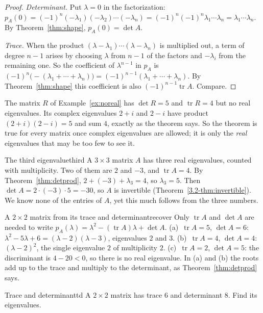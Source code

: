 \documentclass[11pt]{article}
\begin{document}
\begin{proof}
\emph{Determinant.} Put $\lambda=0$ in the factorization: $p_A(0)=(-1)^n(-\lambda_1)(-\lambda_2)\cdots(-\lambda_n)=(-1)^n(-1)^n\lambda_1\cdots\lambda_n=\lambda_1\cdots\lambda_n$. By Theorem~\ref{thm:shape}, $p_A(0)=\det A$.

\emph{Trace.} When the product $(\lambda-\lambda_1)\cdots(\lambda-\lambda_n)$ is multiplied out, a term of degree $n-1$ arises by choosing $\lambda$ from $n-1$ of the factors and $-\lambda_i$ from the remaining one. So the coefficient of $\lambda^{n-1}$ in $p_A$ is $(-1)^n\bigl(-(\lambda_1+\cdots+\lambda_n)\bigr)=(-1)^{n-1}(\lambda_1+\cdots+\lambda_n)$. By Theorem~\ref{thm:shape} this coefficient is also $(-1)^{n-1}\operatorname{tr}A$. Compare.
\end{proof}

The matrix $R$ of Example~\ref{ex:noreal} has $\det R=5$ and $\operatorname{tr}R=4$ but no real eigenvalues. Its complex eigenvalues $2+i$ and $2-i$ have product $(2+i)(2-i)=5$ and sum $4$, exactly as the theorem says. So the theorem is true for every matrix once complex eigenvalues are allowed; it is only the \emph{real} eigenvalues that may be too few to see it.

\begin{exmp}{The third eigenvalue}{third}
A $3\times3$ matrix $A$ has three real eigenvalues, counted with multiplicity. Two of them are $2$ and $-3$, and $\operatorname{tr}A=4$. By Theorem~\ref{thm:detprod}, $2+(-3)+\lambda_3=4$, so $\lambda_3=5$. Then $\det A=2\cdot(-3)\cdot5=-30$, so $A$ is invertible (Theorem~\ref{3.2-thm:invertible}). We know none of the entries of $A$, yet this much follows from the three numbers.
\end{exmp}

\begin{exmp}{A $2\times2$ matrix from its trace and determinant}{recover}
Only $\operatorname{tr}A$ and $\det A$ are needed to write $p_A(\lambda)=\lambda^2-(\operatorname{tr}A)\lambda+\det A$. (a)~$\operatorname{tr}A=5$, $\det A=6$: $\lambda^2-5\lambda+6=(\lambda-2)(\lambda-3)$, eigenvalues $2$ and $3$. (b)~$\operatorname{tr}A=4$, $\det A=4$: $(\lambda-2)^2$, the single eigenvalue $2$ of multiplicity $2$. (c)~$\operatorname{tr}A=2$, $\det A=5$: the discriminant is $4-20<0$, so there is no real eigenvalue. In (a) and (b) the roots add up to the trace and multiply to the determinant, as Theorem~\ref{thm:detprod} says.
\end{exmp}

\begin{kc}{Trace and determinant}{td}
A $2\times2$ matrix has trace $6$ and determinant $8$. Find its eigenvalues.
\end{kc}
\end{document}
